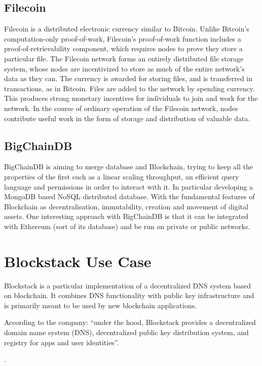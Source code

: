 \subsection*{Filecoin}
Filecoin is a distributed electronic currency similar to Bitcoin. Unlike Bitcoin’s computation-only proof-of-work, Filecoin’s proof-of-work function includes a proof-of-retrievability component, which requires nodes to prove they store a particular file. The Filecoin network forms an entirely distributed file storage system, whose nodes are incentivized to store as much of the entire network’s data as they can. The currency is awarded for storing files, and is transferred in transactions, as in Bitcoin. Files are added to the network by spending currency. This produces strong monetary incentives for individuals to join and work for the network. In the course of ordinary operation of the Filecoin network, nodes contribute useful work in the form of storage and distribution of valuable data.

\subsection*{BigChainDB}
BigChainDB is aiming to merge database and Blockchain, trying to keep all the properties of the first such as a linear scaling throughput, an efficient query language and permissions in order to interact with it. In particular developing a MongoDB based NoSQL distributed database.
With the fundamental features of Blockchain as decentralisation, immutability, creation and movement of digital assets.
One interesting approach with BigChainDB is that it can be integrated with Ethereum (sort of its database) and be run on private or public networks.

\section{Blockstack Use Case}
Blockstack is a particular implementation of a decentralized DNS system based on blockchain. It combines DNS functionality with public key infrastructure and is primarily meant to be used by new blockchain applications.

According to the company: \enquote{under the hood, Blockstack provides a decentralized domain name system (DNS), decentralized public key distribution system, and registry for apps and user identities}.
\begin{notation}
	 .
\end{notation}


